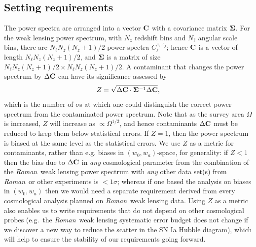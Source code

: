 \documentclass[usenatbib]{mnras}
\newcommand{\wfirst}{{\slshape Roman}}
\begin{document}
\subsection{Setting requirements}

The power spectra are arranged into a vector ${\bf C}$ with
a covariance matrix ${\bf\Sigma}$. For the weak lensing power spectrum, with
$N_z$ redshift bins and $N_\ell$ angular scale bins, there are $N_\ell
N_z(N_z+1)/2$ power spectra $C_\ell^{z_i,z_j}$; hence ${\bf C}$ is a
vector of length $N_\ell N_z(N_z+1)/2$, and ${\bf\Sigma}$ is a matrix
of size $N_\ell N_z(N_z+1)/2 \times N_\ell N_z(N_z+1)/2$. A
contaminant that changes the power spectrum by $\Delta {\bf C}$ can
have its significance assessed by
\begin{equation}
Z = \sqrt{\Delta{\bf C}\cdot{\bf\Sigma}^{-1}\Delta{\bf C}},
\label{eq:alpha}
\end{equation}
which is the number of $\sigma$s at which one could distinguish the
correct power spectrum from the contaminated power spectrum. Note that
as the survey area $\Omega$ is increased, $Z$ will increase as
$\propto\Omega^{1/2}$, and hence contaminants $\Delta{\bf C}$ must be
reduced to keep them below statistical errors. If $Z=1$, then the
power spectrum is biased at the same level as the statistical
errors. We use $Z$ as a metric for contaminants, rather than
e.g. biases in $(w_0,w_a)$-space, for generality: if $Z<1$ then the
bias due to $\Delta{\bf C}$ in {\em any} cosmological parameter from
the combination of the \wfirst\ weak lensing power spectrum with {\em any} other
data set(s) from \wfirst\ or other experiments is $<1\sigma$; whereas if
one based the analysis on biases in $(w_0,w_a)$ then we would need a
separate requirement derived from every cosmological analysis planned
on \wfirst\ weak lensing data. Using $Z$ as a metric also enables us to write
requirements that do not depend on other cosmological probes (e.g.\
the \wfirst\ weak lensing systematic error budget does not change if we discover a
new way to reduce the scatter in the SN Ia Hubble diagram), which will
help to ensure the stability of our requirements going forward.
\end{document}
